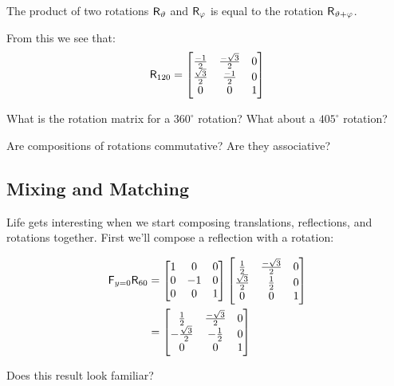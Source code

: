 \begin{thm}
The product of two rotations $\mathsf{R}_\vartheta$ and $\mathsf{R}_\varphi$ is
equal to the rotation $\mathsf{R}_{\vartheta+\varphi}$.
\end{thm}

From this we see that:
\[
\mathsf{R}_{120} =
\begin{bmatrix}
\frac{-1}{2} & \frac{-\sqrt{3}}{2} & 0\\
\frac{\sqrt{3}}{2} & \frac{-1}{2} & 0\\
0 & 0 & 1
\end{bmatrix}
\]

\begin{ques} What is the rotation matrix for a $360^\circ$ rotation? What about a $405^\circ$ rotation?
\end{ques}
\QM

\begin{ques}
Are compositions of rotations commutative?  Are they
associative?
\end{ques}
\QM



\subsection{Mixing and Matching}

Life gets interesting when we start composing translations,
reflections, and rotations together.  First we'll compose a reflection
with a rotation:

\begin{align*}
\mathsf{F}_{y=0}\mathsf{R}_{60} &= \begin{bmatrix}
1 &  0 & 0\\
0 & -1 & 0\\
0 &  0 & 1
\end{bmatrix}
\begin{bmatrix}
\frac{1}{2} & \frac{-\sqrt{3}}{2} & 0\\ \frac{\sqrt{3}}{2} &
\frac{1}{2} & 0\\ 0 & 0 & 1
\end{bmatrix}\\
&= \begin{bmatrix}
\frac{1}{2} & \frac{-\sqrt{3}}{2} & 0\\
-\frac{\sqrt{3}}{2} & -\frac{1}{2} & 0\\
0 & 0 & 1
\end{bmatrix}
\end{align*}

\begin{ques}
Does this result look familiar?
\end{ques}
\QM

